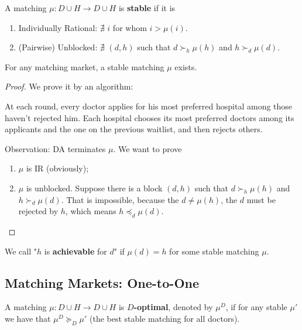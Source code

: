 \documentclass[11pt]{elegantbook}
\begin{document}
\begin{definition}[Stable]
    \normalfont
    A matching $\mu: D\cup H \rightarrow D\cup H$ is \textbf{stable} if it is
    \begin{enumerate}[$\circ$]
        \item Individually Rational: $\nexists$ $i$ for whom $i>\mu(i)$.
        \item (Pairwise) Unblocked: $\nexists$ $(d,h)$ such that $d\succ_h \mu(h)$ and $h\succ_d \mu(d)$.
    \end{enumerate}
\end{definition}

\begin{theorem}
    For any matching market, a stable matching $\mu$ exists.
\end{theorem}
\begin{proof}
    We prove it by an algorithm:
    \begin{definition}
        \normalfont
        At each round, every doctor applies for his most preferred hospital among those haven't rejected him. Each hospital chooses its most preferred doctors among its applicants and the one on the previous waitlist, and then rejects others.
    \end{definition}
    Observation: DA terminates $\mu$. We want to prove
    \begin{enumerate}
        \item $\mu$ is IR (obviously);
        \item $\mu$ is unblocked.
        \subitem Suppose there is a block $(d,h)$ such that $d\succ_h \mu(h)$ and $h\succ_d \mu(d)$. That is impossible, because the $d\neq \mu(h)$, the $d$ must be rejected by $h$, which means $h\preceq_d \mu(d)$.
    \end{enumerate}
\end{proof}

\begin{note}
    We call "$h$ is \textbf{achievable} for $d$" if $\mu(d)=h$ for some stable matching $\mu$.
\end{note}


\subsection{Matching Markets: One-to-One}
\begin{definition}
    \normalfont
    A matching $\mu: D\cup H \rightarrow D\cup H$ is \textbf{$D$-optimal}, denoted by $\mu^D$, if for any stable $\mu'$ we have that $\mu^D\succeq_D \mu'$ (the best stable matching for all doctors).
\end{definition}
\end{document}
